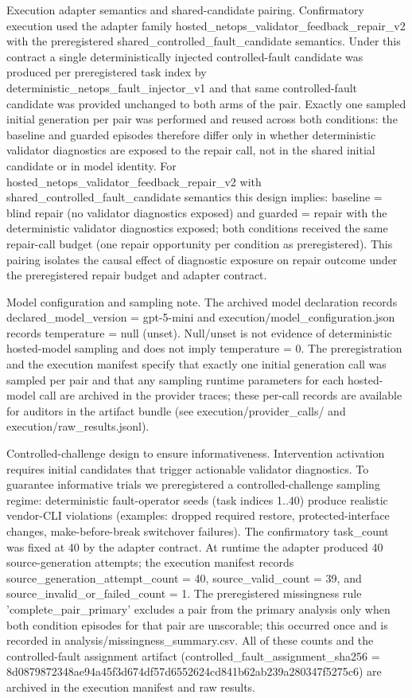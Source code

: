\documentclass[conference]{IEEEtran}
\begin{document}
Execution adapter semantics and shared-candidate pairing. Confirmatory execution used the adapter family hosted\_netops\_validator\_feedback\_repair\_v2 with the preregistered shared\_controlled\_fault\_candidate semantics. Under this contract a single deterministically injected controlled-fault candidate was produced per preregistered task index by deterministic\_netops\_fault\_injector\_v1 and that same controlled-fault candidate was provided unchanged to both arms of the pair. Exactly one sampled initial generation per pair was performed and reused across both conditions: the baseline and guarded episodes therefore differ only in whether deterministic validator diagnostics are exposed to the repair call, not in the shared initial candidate or in model identity. For hosted\_netops\_validator\_feedback\_repair\_v2 with shared\_controlled\_fault\_candidate semantics this design implies: baseline = blind repair (no validator diagnostics exposed) and guarded = repair with the deterministic validator diagnostics exposed; both conditions received the same repair-call budget (one repair opportunity per condition as preregistered). This pairing isolates the causal effect of diagnostic exposure on repair outcome under the preregistered repair budget and adapter contract.

Model configuration and sampling note. The archived model declaration records declared\_model\_version = gpt-5-mini and execution/model\_configuration.json records temperature = null (unset). Null/unset is not evidence of deterministic hosted-model sampling and does not imply temperature = 0. The preregistration and the execution manifest specify that exactly one initial generation call was sampled per pair and that any sampling runtime parameters for each hosted-model call are archived in the provider traces; these per-call records are available for auditors in the artifact bundle (see execution/provider\_calls/ and execution/raw\_results.jsonl).

Controlled-challenge design to ensure informativeness. Intervention activation requires initial candidates that trigger actionable validator diagnostics. To guarantee informative trials we preregistered a controlled-challenge sampling regime: deterministic fault-operator seeds (task indices 1..40) produce realistic vendor-CLI violations (examples: dropped required restore, protected-interface changes, make-before-break switchover failures). The confirmatory task\_count was fixed at 40 by the adapter contract. At runtime the adapter produced 40 source-generation attempts; the execution manifest records source\_generation\_attempt\_count = 40, source\_valid\_count = 39, and source\_invalid\_or\_failed\_count = 1. The preregistered missingness rule 'complete\_pair\_primary' excludes a pair from the primary analysis only when both condition episodes for that pair are unscorable; this occurred once and is recorded in analysis/missingness\_summary.csv. All of these counts and the controlled-fault assignment artifact (controlled\_fault\_assignment\_sha256 = 8d087987\allowbreak{}2348ae94\allowbreak{}a45f3d67\allowbreak{}4df57d65\allowbreak{}52624cd8\allowbreak{}41b62ab2\allowbreak{}39a28034\allowbreak{}7f5275c6) are archived in the execution manifest and raw results.
\end{document}
